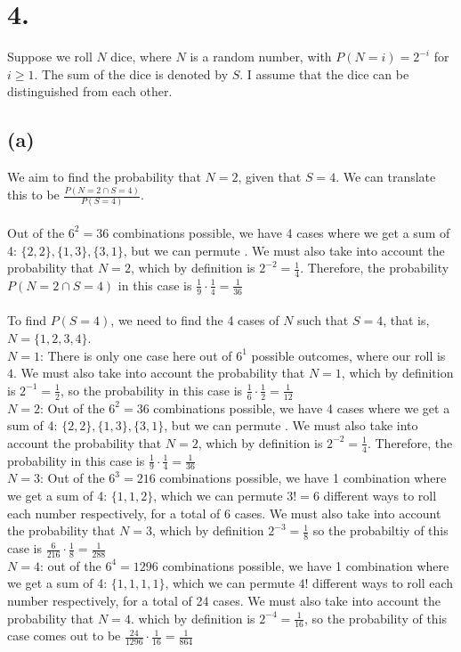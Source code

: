 \documentclass{article}
\begin{document}
\section*{4.}
{\Large 
Suppose we roll $N$ dice, where $N$ is a random number, with $P(N = i) = 2^{-i}$ for $i \geq 1$. The sum of the dice is denoted by $S$. I assume that the dice can be distinguished from each other.

\subsection*{(a)}
We aim to find the probability that $N = 2$, given that $S = 4$. We can translate this to be $\frac{P(N = 2 \cap S = 4)}{P(S = 4)}$. \\ \\
Out of the $6^2 = 36$ combinations possible, we have 4 cases where we get a sum of 4: $\{2, 2\}, \{1, 3\}, \{3, 1\}$, but we can permute . We must also take into account the probability that $N = 2$, which by definition is $2^{-2} = \frac{1}{4}$. Therefore, the probability $P(N = 2 \cap S = 4)$ in this case is $\frac{1}{9} \cdot \frac{1}{4} = \frac{1}{36}$\\ \\ 
To find $P(S = 4)$, we need to find the 4 cases of $N$ such that $S = 4$, that is, $N = \{1, 2, 3, 4\}$. \\
$N = 1$: There is only one case here out of $6^1$ possible outcomes, where our roll is ${4}$. We must also take into account the probability that $N = 1$, which by definition is $2^{-1} = \frac{1}{2}$, so the probability in this case is $\frac{1}{6} \cdot \frac{1}{2} = \frac{1}{12}$ \\ 
$N = 2$: Out of the $6^2 = 36$ combinations possible, we have 4 cases where we get a sum of 4: $\{2, 2\}, \{1, 3\}, \{3, 1\}$, but we can permute . We must also take into account the probability that $N = 2$, which by definition is $2^{-2} = \frac{1}{4}$. Therefore, the probability in this case is $\frac{1}{9} \cdot \frac{1}{4} = \frac{1}{36}$ \\ 
$N = 3$: Out of the $6^3 = 216$ combinations possible, we have 1 combination where we get a sum of 4: $\{1, 1, 2\}$, which we can permute $3! = 6$ different ways to roll each number respectively, for a total of 6 cases. We must also take into account the probability that $N = 3$, which by definition $2^{-3} = \frac{1}{8}$ so the probabiltiy of this case is $\frac{6}{216} \cdot \frac{1}{8} = \frac{1}{288}$ \\ 
$N = 4$: out of the $6^4 = 1296$ combinations possible, we have 1 combination where we get a sum of 4: $\{1, 1, 1, 1\}$, which we can permute $4!$ different ways to roll each number respectively, for a total of 24 cases. We must also take into account the probability that $N = 4$. which by definition is $2^{-4} = \frac{1}{16}$, so the probability of this case comes out to be $\frac{24}{1296} \cdot \frac{1}{16} = \frac{1}{864}$ \\ 
}
\end{document}
